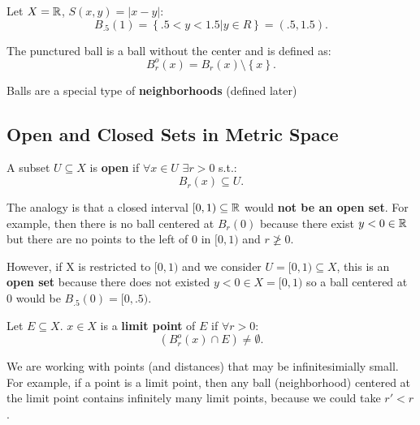 \documentclass[a4paper]{article}
\begin{document}
\begin{remark}
  Let $X = \mathbb{R}$, $S(x,y) =  |x - y|$:
  \[
    B_{.5}(1) = \left\{ .5 < y < 1.5 | y \in R\right\} = \left( .5,1.5 \right)  
  .\] 
  
\end{remark}

\begin{definition}
  The punctured ball is a ball without the center and is defined as:
  \[
  B_r^o(x) = B_r(x) \setminus \left\{ x \right\} 
  .\] 
\end{definition}

\begin{note}
  Balls are a special type of \textbf{neighborhoods} (defined later)
\end{note}

\subsection{Open and Closed Sets in Metric Space}
\begin{definition}
  A subset $U \subseteq X$ is \textbf{open} if $\forall x \in U$ $\exists r > 0$ s.t.:
  \[
  B_r(x) \subseteq U
  .\]
  
\end{definition}
\begin{remark}
  The analogy is that a closed interval $[0,1) \subseteq \mathbb{R}$  would  \textbf{not be an open set}. For example, then there is no ball centered at
  $B_r(0)$ because there exist $y < 0 \in \mathbb{R}$ but there are no points to the left of 0 in $[0,1)$ and $r \not\geq 0$.  
\end{remark}

\begin{remark}
  However, if X is restricted to $[0,1)$ and we consider $U = [0,1) \subseteq  X$, this is an \textbf{open set} because 
  there does not existed $y < 0 \in X = [0,1)$ so a ball centered at 0 would be $B_{.5}(0) = [0,.5)$. 
\end{remark}

\begin{definition}
  Let $E \subseteq X$. $x \in X$ is a \textbf{limit point} of $E$ if $\forall r > 0$:
  \[
    (B_r^o (x) \cap E) \neq \emptyset
  .\] 
\end{definition}

\begin{note}
  We are working with points (and distances) that may be infinitesimially small. For example, if a point is a limit point,
  then any ball (neighborhood) centered at the limit point contains infinitely many limit points, because we could take $r' < r$.
\end{note}
\end{document}
